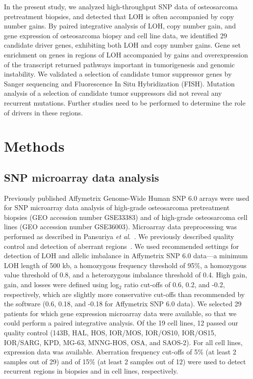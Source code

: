 In the present study, we analyzed high\hyp{}throughput SNP data of osteosarcoma pretreatment biopsies, and detected that LOH is often accompanied by copy number gains. By paired integrative analysis of LOH, copy number gain, and gene expression of osteosarcoma biopsy and cell line data, we identified 29 candidate driver genes, exhibiting both LOH and copy number gains. Gene set enrichment on genes in regions of LOH accompanied by gains and overexpression of the transcript returned pathways important in tumorigenesis and genomic instability. We validated a selection of candidate tumor suppressor genes by Sanger sequencing and Fluorescence In Situ Hybridization (FISH). Mutation analysis of a selection of candidate tumor suppressors did not reveal any recurrent mutations. Further studies need to be performed to determine the role of drivers in these regions.

\section{Methods}\label{methods8}
\subsection{SNP microarray data analysis}
Previously published Affymetrix Genome\hyp{}Wide Human SNP 6.0 arrays were used for SNP microarray data analysis of high\hyp{}grade osteosarcoma pretreatment biopsies (GEO accession number GSE33383) and of high\hyp{}grade osteosarcoma cell lines (GEO accession number GSE36003). Microarray data preprocessing was performed as described in Pansuriya {\it et al}.~\cite{pansuriya2011genome}. We previously described quality control and detection of aberrant regions~\cite{kuijjer2012identification}. We used recommended settings for detection of LOH and allelic imbalance in Affymetrix SNP 6.0 data---a minimum LOH length of 500 kb, a homozygous frequency threshold of 95\%, a homozygous value threshold of 0.8, and a heterozygous imbalance threshold of 0.4. High gain, gain, and losses were defined using log$_2$ ratio cut-offs of 0.6, 0.2, and -0.2, respectively, which are slightly more conservative cut-offs than recommended by the software (0.6, 0.18, and -0.18 for Affymetrix SNP 6.0 data). We selected 29 patients for which gene expression microarray data were available, so that we could perform a paired integrative analysis. Of the 19 cell lines, 12 passed our quality control (143B, HAL, HOS, IOR/MOS, IOR/OS10, IOR/OS15, IOR/SARG, KPD, MG-63, MNNG-HOS, OSA, and SAOS-2). For all cell lines, expression data was available. Aberration frequency cut-offs of 5\% (at least 2 samples out of 29) and of 15\% (at least 2 samples out of 12) were used to detect recurrent regions in biopsies and in cell lines, respectively.

